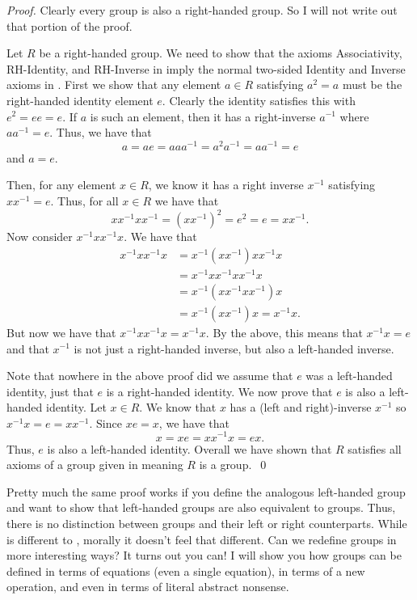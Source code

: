 \documentclass{article}
\begin{document}
\begin{proof}
  Clearly every group is also a right-handed group.
  So I will not write out that portion of the proof.

  Let $R$ be a right-handed group.
  We need to show that the axioms Associativity, RH-Identity, and RH-Inverse in  imply the normal two-sided Identity and Inverse axioms in .
  First we show that any element $a \in R$ satisfying $a^{2} = a$ must be the right-handed identity element $e$.
  Clearly the identity satisfies this with $e^{2} = ee = e$.
  If $a$ is such an element, then it has a right-inverse $a^{-1}$ where $a a^{-1} = e$.
  Thus, we have that
  \[
    a = ae = a a a^{-1} = a^{2} a^{-1} = a a^{-1} = e
  \]
  and $a = e$.

  Then, for any element $x \in R$, we know it has a right inverse $x^{-1}$ satisfying $x x^{-1} = e$.
  Thus, for all $x \in R$ we have that
  \[
    x x^{-1} x x^{-1} = \left(x x^{-1}\right)^{2} = e^{2} = e = x x^{-1}.
  \]
  Now consider $x^{-1} x x^{-1} x$.
  We have that
  \begin{align*}
    x^{-1} x x^{-1} x &= x^{-1} \left( x x^{-1} \right) x x^{-1} x \\
                      &= x^{-1} x x^{-1} x x^{-1} x \\
                      &= x^{-1} \left(x x^{-1} x x^{-1}\right) x \\
                      &= x^{-1} \left(x x^{-1}\right) x = x^{-1} x.
  \end{align*}
  But now we have that $x^{-1} x x^{-1} x = x^{-1} x$.
  By the above, this means that $x^{-1} x = e$ and that $x^{-1}$ is not just a right-handed inverse, but also a left-handed inverse.

  Note that nowhere in the above proof did we assume that $e$ was a left-handed identity, just that $e$ is a right-handed identity.
  We now prove that $e$ is also a left-handed identity.
  Let $x \in R$.
  We know that $x$ has a (left and right)-inverse $x^{-1}$ so $x^{-1} x = e = x x^{-1}$.
  Since $x e = x$, we have that
  \[
    x = x e = x x^{-1} x = e x.
  \]
  Thus, $e$ is also a left-handed identity.
  Overall we have shown that $R$ satisfies all axioms of a group given in  meaning $R$ is a group.\ \qed
\end{proof}

Pretty much the same proof works if you define the analogous left-handed group and want to show that left-handed groups are also equivalent to groups.
Thus, there is no distinction between groups and their left or right counterparts.
While  is different to , morally it doesn't feel that different.
Can we redefine groups in more interesting ways?
It turns out you can!
I will show you how groups can be defined in terms of equations (even a single equation), in terms of a new operation, and even in terms of literal abstract nonsense.
\end{document}
